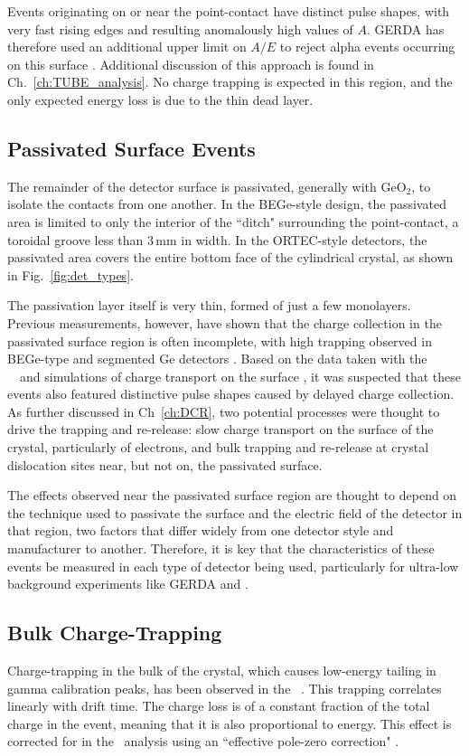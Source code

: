 Events originating on or near the point-contact have distinct pulse shapes, with very fast rising edges and resulting anomalously high values of $A$. GERDA has therefore used an additional upper limit on $A/E$ to reject alpha events occurring on this surface \cite{GERDA2017}. Additional discussion of this approach is found in Ch.~\ref{ch:TUBE_analysis}. No charge trapping is expected in this region, and the only expected energy loss is due to the thin dead layer. 

\subsection{Passivated Surface Events}
The remainder of the detector surface is passivated, generally with GeO$_2$, to isolate the contacts from one another. In the BEGe-style design, the passivated area is limited to only the interior of the ``ditch" surrounding the point-contact, a toroidal groove less than 3\,mm in width. In the ORTEC-style detectors, the passivated area covers the entire bottom face of the cylindrical crystal, as shown in Fig.~\ref{fig:det_types}. 

The passivation layer itself is very thin, formed of just a few monolayers. Previous measurements, however, have shown that the charge collection in the passivated surface region is often incomplete, with high trapping observed in BEGe-type and segmented Ge detectors \cite{TUBE_GERDA} \cite{Abt2017}. Based on the data taken with the \MJ\ \DEM\ and simulations of charge transport on the surface \cite{Mullowney2012}, it was suspected that these events also featured distinctive pulse shapes caused by delayed charge collection. As further discussed in Ch~\ref{ch:DCR}, two potential processes were thought to drive the trapping and re-release: slow charge transport on the surface of the crystal, particularly of electrons, and bulk trapping and re-release at crystal dislocation sites near, but not on, the passivated surface. 

The effects observed near the passivated surface region are thought to depend on the technique used to passivate the surface and the electric field of the detector in that region, two factors that differ widely from one detector style and manufacturer to another. Therefore, it is key that the characteristics of these events be measured in each type of detector being used, particularly for ultra-low background experiments like GERDA and \MJ . 

\subsection{Bulk Charge-Trapping}
Charge-trapping in the bulk of the crystal, which causes low-energy tailing in gamma calibration peaks, has been observed in the \MJ\ \DEM. This trapping correlates linearly with drift time. The charge loss is of a constant fraction of the total charge in the event, meaning that it is also proportional to energy. This effect is corrected for in the \MJ\ analysis using an ``effective pole-zero correction" \cite{EnergyUnidoc}.

